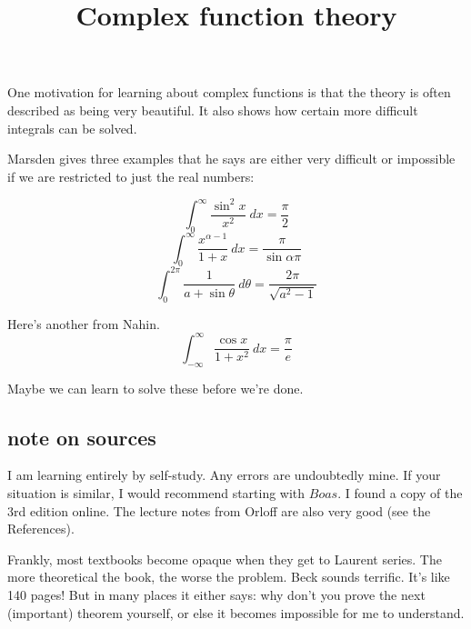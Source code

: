 \documentclass[11pt, oneside]{article}
\title{Complex function theory}
\date{}
\begin{document}
\maketitle
\Large


One motivation for learning about complex functions is that the theory is often described as being very beautiful.  It also shows how certain more difficult integrals can be solved. 

Marsden gives three examples that he says are either very difficult or impossible if we are restricted to just the real numbers:

\[ \int_0^{\infty} \frac{\sin^2 x}{x^2} \ dx = \frac{\pi}{2} \]
\[ \int_0^{\infty} \frac{x^{\alpha - 1}}{1 + x} \ dx = \frac{\pi}{\sin \alpha \pi} \]
\[ \int_0^{2 \pi} \frac{1}{a + \sin \theta} \ d \theta = \frac{2 \pi}{\sqrt{a^2 - 1}} \]

Here's another from Nahin.
\[ \int_{-\infty}^{\infty} \frac{\cos x}{1 + x^2} \ dx = \frac{\pi}{e} \]

Maybe we can learn to solve these before we're done.

\subsection*{note on sources}

I am learning entirely by self-study.  Any errors are undoubtedly mine.  If your situation is similar, I would recommend starting with $Boas$.  I found a copy of the 3rd edition online.  The lecture notes from Orloff are also very good (see the References).  

Frankly, most textbooks become opaque when they get to Laurent series.  The more theoretical the book, the worse the problem.  Beck sounds terrific.  It's like 140 pages!  But in many places it either says:  why don't you prove the next (important) theorem yourself, or else it becomes impossible for me to understand.
\end{document}
